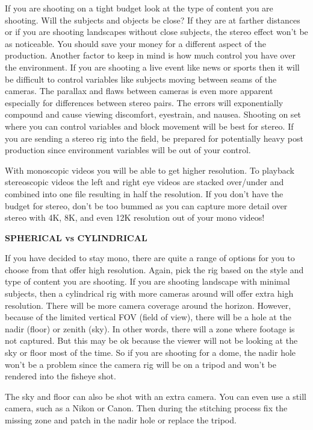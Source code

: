 \begin{fullwidth}
If you are shooting on a tight budget look at the type of content you are shooting. Will the subjects and objects be close? If they are at farther distances or if you are shooting landscapes without close subjects, the stereo effect won’t be as noticeable. You should save your money for a different aspect of the production. Another factor to keep in mind is how much control you have over the environment. If you are shooting a live event like news or sports then it will be difficult to control variables like subjects moving between seams of the cameras. The parallax and flaws between cameras is even more apparent especially for differences between stereo pairs. The errors will exponentially compound and cause viewing discomfort, eyestrain, and nausea. Shooting on set where you can control variables and block movement will be best for stereo. If you are sending a stereo rig into the field, be prepared for potentially heavy post production since environment variables will be out of your control. 

With monoscopic videos you will be able to get higher resolution. To playback stereoscopic videos the left and right eye videos are stacked over/under and combined into one file resulting in half the resolution. If you don’t have the budget for stereo, don’t be too bummed as you can capture more detail over stereo with 4K, 8K, and even 12K resolution out of your mono videos!

{\bfseries SPHERICAL vs CYLINDRICAL}


If you have decided to stay mono, there are quite a range of options for you to choose from that offer high resolution. Again, pick the rig based on the style and type of content you are shooting. If you are shooting landscape with minimal subjects, then a cylindrical rig with more cameras around will offer extra high resolution. There will be more camera coverage around the horizon. However, because of the limited vertical FOV (field of view), there will be a hole at the nadir (floor) or zenith (sky). In other words, there will a zone where footage is not captured. But this may be ok because the viewer will not be looking at the sky or floor most of the time. So if you are shooting for a dome, the nadir hole won’t be a problem since the camera rig will be on a tripod and won't be rendered into the fisheye shot.

The sky and floor can also be shot with an extra camera. You can even use a still camera, such as a Nikon or Canon. Then during the stitching process fix the missing zone and patch in the nadir hole or replace the tripod. 


\end{fullwidth}

